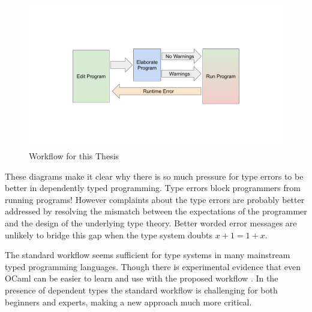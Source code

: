 \begin{figure}
\includegraphics[width=5in]{fig/new-workflow.pdf}

\caption{Workflow for this Thesis}
\label{fig:intro-thesis-workflow}
\end{figure}

These diagrams make it clear why there is so much pressure for type errors to be better in dependently typed programming\cite{eremondi2019framework}.
Type errors block programmers from running programs! However complaints about the type errors are probably better addressed by resolving the mismatch between the expectations of the programmer and the design of the underlying type theory.
Better worded error messages are unlikely to bridge this gap when the type system doubts $x+1=1+x$.

The standard workflow seems sufficient for type systems in many mainstream typed programming languages.
Though there is experimental evidence that even OCaml can be easier to learn and use with the proposed workflow \cite{10.1145/2951913.2951915}.
In the presence of dependent types the standard workflow is challenging for both beginners and experts, making a new approach much more critical.


